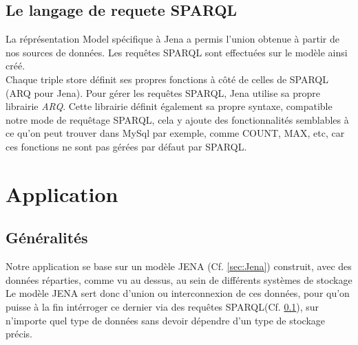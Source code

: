 \documentclass{article}
\begin{document}
\subsection{Le langage de requete SPARQL}\label{sec:Sparql}
La réprésentation Model spécifique à Jena a permis l'union obtenue à partir de nos sources de données. Les requêtes SPARQL sont effectuées sur le modèle ainsi créé.\\
Chaque triple store définit ses propres fonctions à côté de celles de SPARQL (ARQ pour Jena). Pour gérer les requêtes SPARQL, Jena utilise sa propre librairie \textit{ARQ}. Cette librairie définit également sa propre syntaxe, compatible notre mode de requêtage SPARQL, cela y ajoute des fonctionnalités semblables à ce qu'on peut trouver dans MySql par exemple, comme COUNT, MAX, etc, car ces fonctions ne sont pas gérées par défaut par SPARQL.



\section{Application}
\subsection{Généralités}
Notre application se base sur un modèle JENA (Cf. \ref{sec:Jena}) construit, avec des données réparties, comme vu au dessus, au sein de différents systèmes de stockage\\
Le modèle JENA sert donc d'union ou interconnexion de ces données, pour qu'on puisse à la fin intérroger ce dernier via des requêtes SPARQL(Cf. \ref{sec:Sparql}), sur n'importe quel type de données sans devoir dépendre d'un type de stockage précis. 
\end{document}
